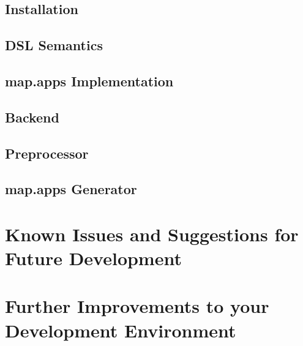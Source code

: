 \documentclass[a4paper, 12pt, titlepage, headsepline, listof = totoc, bibliography = totoc, numbers = noenddot]{scrbook} %
\begin{document}


\section{Installation}


\section{DSL Semantics}


\section{map.apps Implementation}


\section{Backend}\label{sec:backend}


\section{Preprocessor}


\section{map.apps Generator}





\clearpage
\appendix
{}		%
%

\chapter{Known Issues and Suggestions for Future Development}


\chapter{Further Improvements to your Development Environment}

\end{document}
